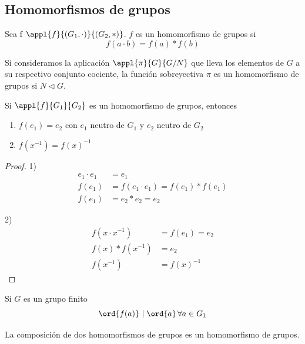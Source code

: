 \documentclass{apuntes}
\begin{document}
 \subsection{Homomorfismos de grupos}
 \begin{defn}[Homomorfismo]
 Sea f $\appl{f}{(G_1, \cdot )}{(G_2, \ast )}$. $f$ es un homomorfismo de grupos si 
 \[ f(a\cdot b) = f(a)\ast f(b) \]
 \end{defn}
 
 \begin{example}
 Si consideramos la aplicación $\appl{\pi}{G}{G/N}$ que lleva los elementos de $G$ a su respectivo conjunto cociente, la función sobreyectiva $\pi$ es un homomorfismo de grupos si $N\lhd G$.
 \end{example}
 
 \begin{props} 
 Si $\appl{f}{G_1}{G_2}$ es un homomorfismo de grupos, entonces
 \begin{enumerate}
 \item $f(e_1) = e_2$ con $e_1$ neutro de $G_1$ y $e_2$ neutro de $G_2$
 \item $f(x^{-1}) = f(x)^{-1}$
 \end{enumerate}
 \end{props}
 
 \begin{proof} 
 1) 
 \begin{align*}
 e_1\cdot e_1 &= e_1 \\
 f(e_1)& =f(e_1\cdot e_1) = f(e_1)\ast f(e_1) \\
 f(e_1) &= e_2 \ast e_2 = e_2
 \end{align*}

 2) \begin{align*}
 f(x\cdot x^{-1}) &= f(e_1) = e_2 \\ 
 f(x)\ast f(x^{-1}) &= e_2 \\
  f(x^{-1}) &= f(x)^{-1}
  \end{align*}
 
 \end{proof}
 
 

\begin{remark} Si $G$ es un grupo finito \[\ord{f(a)}\ |\;\ord{a}\, \forall a \in G_1 \] \end{remark}

\begin{lemma}
La composición de dos homomorfismos de grupos es un homomorfismo de grupos.
\end{lemma}
\end{document}
